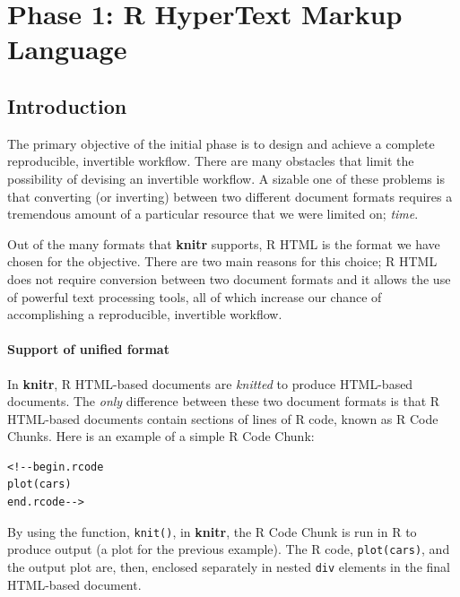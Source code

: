 \documentclass[a4paper, 12pt]{report}
\begin{document}
\chapter{Phase 1: R HyperText Markup Language}
\begin{figure}[h]
\centering
\end{figure}

\section*{Introduction}
\label{sec:3.1}
The primary objective of the initial phase is to design and achieve a complete reproducible, invertible workflow. There are many obstacles that limit the possibility of devising an invertible workflow. A sizable one of these problems is that converting (or inverting) between two different document formats requires a tremendous amount of a particular resource that we were limited on; \emph{time}.

Out of the many formats that \textbf{knitr} supports, R HTML is the format we have chosen for the objective. There are two main reasons for this choice; R HTML does not require conversion between two document formats and it allows the use of powerful text processing tools, all of which increase our chance of accomplishing a reproducible, invertible workflow.

\subsubsection*{Support of unified format}
In \textbf{knitr}, R HTML-based documents are \emph{knitted} to produce HTML-based documents. The \emph{only} difference between these two document formats is that R HTML-based documents contain sections of lines of R code, known as R Code Chunks. Here is an example of a simple R Code Chunk:
\begin{lstlisting}[numbers=none, frame=none]
<!--begin.rcode
plot(cars)
end.rcode-->
\end{lstlisting}
By using the function, \texttt{knit()}, in \textbf{knitr}, the R Code Chunk is run in R to produce output (a plot for the previous example). The R code, \texttt{plot(cars)}, and the output plot are, then, enclosed separately in nested \texttt{div} elements in the final HTML-based document.
\end{document}
